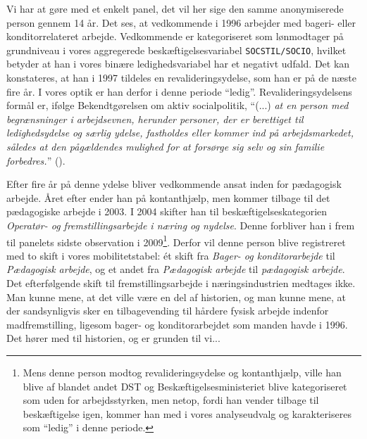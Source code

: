 %
Vi har at gøre med et enkelt panel, det vil her sige den samme anonymiserede person gennem 14 år. Det ses, at vedkommende i 1996 arbejder med bageri- eller konditorrelateret arbejde. Vedkommende er kategoriseret som lønmodtager på grundniveau i vores aggregerede beskæftigelsesvariabel \texttt{SOCSTIL/SOCIO}, hvilket betyder at han i vores binære ledighedsvariabel har et negativt udfald. Det kan konstateres, at han i 1997 tildeles en revalideringsydelse, som han er på de næste fire år. I vores optik er han derfor i denne periode “ledig”. Revalideringsydelsens formål er, ifølge Bekendtgørelsen om aktiv socialpolitik, “(...) \emph{at en person med begrænsninger i arbejdsevnen, herunder personer, der er berettiget til ledighedsydelse og særlig ydelse, fastholdes eller kommer ind på arbejdsmarkedet, således at den pågældendes mulighed for at forsørge sig selv og sin familie forbedres.}” (\textcite{lov_revalidering}).

Efter fire år på denne ydelse bliver vedkommende ansat inden for pædagogisk arbejde.  Året efter ender han på kontanthjælp, men kommer tilbage til det pædagogiske arbejde i 2003. I 2004 skifter han til beskæftigelseskategorien \emph{Operatør- og fremstillingsarbejde i næring og nydelse}. Denne forbliver han i frem til panelets sidste observation i 2009\footnote{Mens denne person modtog revalideringsydelse og kontanthjælp, ville han blive af blandet andet DST og Beskæftigelsesministeriet blive kategoriseret som uden for arbejdsstyrken, men netop, fordi han vender tilbage til beskæftigelse igen, kommer han med i vores analyseudvalg og karakteriseres som “ledig” i denne periode.}. Derfor vil denne person blive registreret med to skift i vores mobilitetstabel: ét skift fra \emph{Bager- og konditorarbejde} til \emph{Pædagogisk arbejde}, og et andet fra \emph{Pædagogisk arbejde} til \emph{pædagogisk arbejde}. Det efterfølgende skift til fremstillingsarbejde i næringsindustrien medtages ikke. Man kunne mene, at det ville være en del af historien, og man kunne mene, at der sandsynligvis sker en tilbagevending til hårdere fysisk arbejde indenfor madfremstilling, ligesom bager- og konditorarbejdet som manden havde i 1996. Det hører med til historien, og er grunden til vi... %

